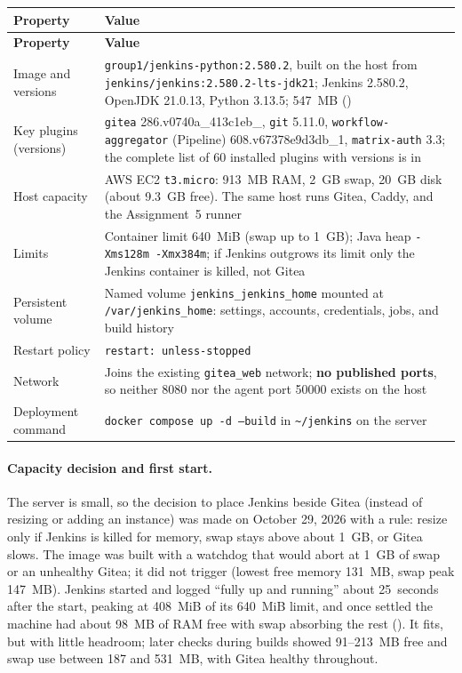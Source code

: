 \begin{tabularx}{\linewidth}{L{3.6cm}Y}
\caption{Jenkins deployment record\label{Table:JenkinsRecord}}\\
\toprule \textbf{Property} & \textbf{Value}\\ \midrule
\endfirsthead
\toprule \textbf{Property} & \textbf{Value}\\ \midrule
\endhead \bottomrule \endlastfoot
Image and versions & \texttt{group1/jenkins-python:2.580.2}, built on the host from \texttt{jenkins/jenkins:2.580.2-lts-jdk21}; Jenkins 2.580.2, OpenJDK 21.0.13, Python 3.13.5; 547~MB ()\\
Key plugins (versions) & \texttt{gitea} 286.v0740a\_413c1eb\_, \texttt{git} 5.11.0, \texttt{workflow-aggregator} (Pipeline) 608.v67378e9d3db\_1, \texttt{matrix-auth} 3.3; the complete list of 60 installed plugins with versions is in \\
Host capacity & AWS EC2 \texttt{t3.micro}: 913~MB RAM, 2~GB swap, 20~GB disk (about 9.3~GB free). The same host runs Gitea, Caddy, and the Assignment~5 runner\\
Limits & Container limit 640~MiB (swap up to 1~GB); Java heap \texttt{-Xms128m -Xmx384m}; if Jenkins outgrows its limit only the Jenkins container is killed, not Gitea\\
Persistent volume & Named volume \texttt{jenkins\_jenkins\_home} mounted at \texttt{/var/jenkins\_home}: settings, accounts, credentials, jobs, and build history\\
Restart policy & \texttt{restart: unless-stopped}\\
Network & Joins the existing \texttt{gitea\_web} network; \textbf{no published ports}, so neither 8080 nor the agent port 50000 exists on the host\\
Deployment command & \texttt{docker compose up -d --build} in \texttt{\textasciitilde/jenkins} on the server\\
\end{tabularx}

\paragraph{Capacity decision and first start.} The server is small, so the decision to place Jenkins beside
Gitea (instead of resizing or adding an instance) was made on October 29, 2026 with a rule: resize only if
Jenkins is killed for memory, swap stays above about 1~GB, or Gitea slows. The image was built with a watchdog
that would abort at 1~GB of swap or an unhealthy Gitea; it did not trigger (lowest free memory 131~MB, swap
peak 147~MB). Jenkins started and logged ``fully up and running'' about 25~seconds after the start, peaking at
408~MiB of its 640~MiB limit, and once settled the machine had about 98~MB of RAM free with swap absorbing the
rest (). It fits, but with little headroom; later checks during builds showed 91--213~MB free and
swap use between 187 and 531~MB, with Gitea healthy throughout.

